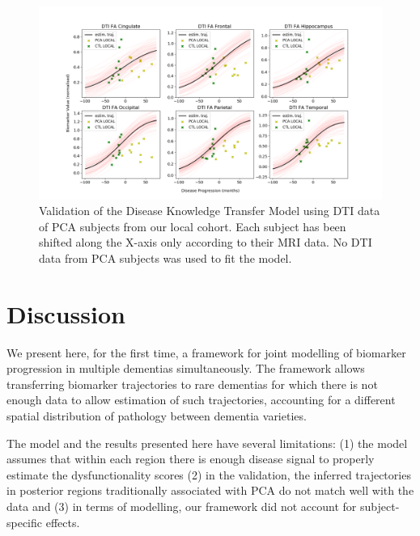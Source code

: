 \documentclass{llncs}
\begin{document}

\begin{figure}
 \includegraphics[width=\textwidth, trim=0 0 0 0, clip]{figures/validDtiPCA.png}
 \caption{Validation of the Disease Knowledge Transfer Model using DTI data of PCA subjects from our local cohort. Each subject has been shifted along the X-axis only according to their MRI data. No DTI data from PCA subjects was used to fit the model.}
\label{fig:DTIvalid}
\end{figure}

\section{Discussion}

We present here, for the first time, a framework for joint modelling of biomarker progression in multiple dementias simultaneously. The framework allows transferring biomarker trajectories to rare dementias for which there is not enough data to allow estimation of such trajectories, accounting for a different spatial distribution of pathology between dementia varieties. 

The model and the results presented here have several limitations: (1) the model assumes that within each region there is enough disease signal to properly estimate the dysfunctionality scores (2) in the validation, the inferred trajectories in posterior regions traditionally associated with PCA do not match well with the data and (3) in terms of modelling, our framework did not account for subject-specific effects.
\end{document}
